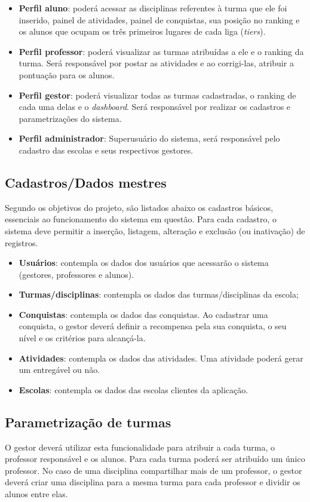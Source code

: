 \documentclass[
    12pt,               %
    openright,          %
    oneside,
    a4paper,            %
    paginasA3,  %
    MODELO,             %
    TODO,               %
    english,            %
    brazil              %
    ]{ifsp-spo-inf-ctds} %
\begin{document}
\begin{itemize}
\item \textbf{Perfil aluno}: poderá acessar as disciplinas referentes à turma que ele foi inserido, painel de atividades, painel de conquistas, sua posição no ranking e os alunos que ocupam os três primeiros lugares de cada liga (\textit{tiers}).
\item \textbf{Perfil professor}: poderá visualizar as turmas atribuídas a ele e o ranking da turma. Será responsável por postar as atividades e ao corrigi-las, atribuir a pontuação para os alunos.
\item \textbf{Perfil gestor}: poderá visualizar todas as turmas cadastradas, o ranking de cada uma delas e o \textit{dashboard}. Será responsável por realizar os cadastros e parametrizações do sistema.
\item \textbf{Perfil administrador}: Superusuário do sistema, será responsável pelo cadastro das escolas e seus respectivos gestores.
\end{itemize}

\subsection{Cadastros/Dados mestres}
Segundo os objetivos do projeto, são listados abaixo os cadastros básicos, essenciais ao funcionamento do sistema em questão. Para cada cadastro, o sistema deve permitir a inserção, listagem, alteração e exclusão (ou inativação) de registros. 
\begin{itemize}
\item \textbf{Usuários}: contempla os dados dos usuários que acessarão o sistema (gestores, professores e alunos).
\item \textbf{Turmas/disciplinas}: contempla os dados das turmas/disciplinas da escola;
\item \textbf{Conquistas}: contempla os dados das conquistas. Ao cadastrar uma conquista, o gestor deverá definir a recompensa pela sua conquista, o seu nível e os critérios para alcançá-la.
\item \textbf{Atividades}: contempla os dados das atividades. Uma atividade poderá gerar um entregável ou não.
\item \textbf{Escolas}: contempla os dados das escolas clientes da aplicação.
\end{itemize}

\subsection{Parametrização de turmas}
O gestor deverá utilizar esta funcionalidade para atribuir a cada turma, o professor responsável e os alunos. Para cada turma poderá ser atribuído um único professor. No caso de uma disciplina compartilhar mais de um professor, o gestor deverá criar uma disciplina para a mesma turma para cada professor e dividir os alunos entre elas. 
\end{document}
